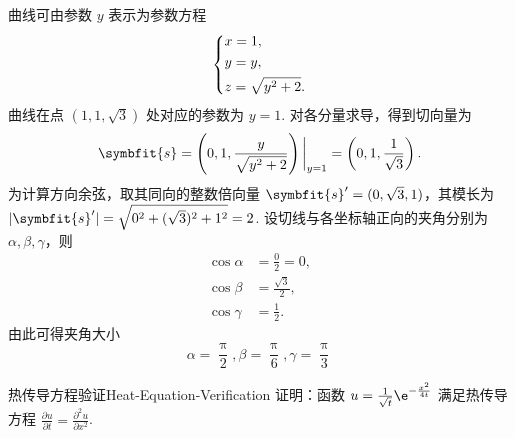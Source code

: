 \begin{solution}
    曲线可由参数 $y$ 表示为参数方程
    \begin{equation}
        \begin{dcases}
            x = 1, \\
            y = y, \\
            z = \sqrt{y^2 + 2}.
        \end{dcases}
    \end{equation}
    曲线在点 $(1, 1, \sqrt{3})$ 处对应的参数为 $y = 1$. 对各分量求导，得到切向量为
    \begin{equation}
        \symbfit{s} = \left( 0, 1, \frac{y}{\sqrt{y^2 + 2}} \right) \bigg|_{y=1} = \left( 0, 1, \frac{1}{\sqrt{3}} \right).
    \end{equation}
    为计算方向余弦，取其同向的整数倍向量 $\symbfit{s}' = (0, \sqrt{3}, 1)$，其模长为 $|\symbfit{s}'| = \sqrt{0^2 + (\sqrt{3})^2 + 1^2} = 2$.
    设切线与各坐标轴正向的夹角分别为 $\alpha, \beta, \gamma$，则
    \begin{equation}
        \begin{aligned}
            \cos \alpha & = \frac{0}{2} = 0,    \\
            \cos \beta  & = \frac{\sqrt{3}}{2}, \\
            \cos \gamma & = \frac{1}{2}.
        \end{aligned}
    \end{equation}
    由此可得夹角大小
    \begin{equation}
        \boxed{\alpha = \frac{\uppi}{2}, \beta = \frac{\uppi}{6}, \gamma = \frac{\uppi}{3}}
    \end{equation}
\end{solution}

\begin{problem}{热传导方程验证}{Heat-Equation-Verification}
    证明：函数 $u = \frac{1}{\sqrt{t}}\e^{-\frac{x^2}{4t}}$ 满足热传导方程 $\frac{\partial u}{\partial t} = \frac{\partial^2 u}{\partial x^2}$.
\end{problem}

